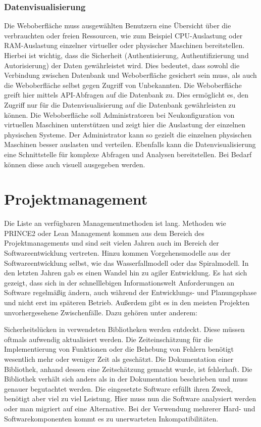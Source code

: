 \subsection{Datenvisualisierung}
Die Weboberfläche muss ausgewählten Benutzern eine Übersicht über die
verbrauchten oder freien Ressourcen, wie zum Beispiel CPU-Auslastung oder
RAM-Auslastung einzelner virtueller oder physischer Maschinen bereitstellen.
Hierbei ist wichtig, dass die Sicherheit (Authentisierung, Authentifizierung
und Autorisierung) der Daten gewährleistet wird. Dies bedeutet, dass sowohl die
Verbindung zwischen Datenbank und Weboberfläche gesichert sein muss, als auch
die Weboberfläche selbst gegen Zugriff von Unbekannten. Die Weboberfläche
greift hier mittels API-Abfragen auf die Datenbank zu. Dies ermöglicht es, den
Zugriff nur für die Datenvisualisierung auf die Datenbank gewährleisten zu
können. Die Weboberfläche soll Administratoren bei Neukonfiguration von
virtuellen Maschinen unterstützen und zeigt hier die Auslastung der einzelnen
physischen Systeme. Der Administrator kann so gezielt die einzelnen physischen
Maschinen besser auslasten und verteilen. Ebenfalls kann die
Datenvisualisierung eine Schnittstelle für komplexe Abfragen und Analysen
bereitstellen. Bei Bedarf können diese auch visuell ausgegeben werden.
\mr%

\chapter{Projektmanagement}
Die Liste an verfügbaren Managementmethoden ist lang. Methoden wie PRINCE2 oder
Lean Management kommen aus dem Bereich des Projektmanagements und sind seit
vielen Jahren auch im Bereich der Softwareentwicklung vertreten. Hinzu kommen
Vorgehensmodelle aus der Softwareentwicklung selbst, wie das Wasserfallmodell
oder das Spiralmodell. In den letzten Jahren gab es einen Wandel hin zu agiler
Entwicklung. Es hat sich gezeigt, dass sich in der schnelllebigen
Informationswelt Anforderungen an Software regelmäßig ändern, auch während der
Entwicklungs- und Planungsphase und nicht erst im späteren Betrieb. Außerdem
gibt es in den meisten Projekten unvorhergesehene Zwischenfälle. Dazu gehören
unter anderem:

\begin{outline}
  \1 Sicherheitslücken in verwendeten Bibliotheken werden entdeckt. Diese
  müssen oftmals aufwendig aktualisiert werden.
  \1 Die Zeiteinschätzung für die Implementierung von Funktionen oder die
  Behebung von Fehlern benötigt wesentlich mehr oder weniger Zeit als
  geschätzt.
  \1 Die Dokumentation einer Bibliothek, anhand dessen eine Zeitschätzung
  gemacht wurde, ist fehlerhaft. Die Bibliothek verhält sich anders als in der
  Dokumentation beschrieben und muss genauer begutachtet werden.
  \1 Die eingesetzte Software erfüllt ihren Zweck, benötigt aber viel zu viel
  Leistung. Hier muss nun die Software analysiert werden oder man migriert auf
  eine Alternative.
  \1 Bei der Verwendung mehrerer Hard- und Softwarekomponenten kommt es zu
  unerwarteten Inkompatibilitäten.
\end{outline}

